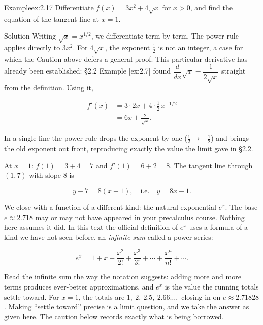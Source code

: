 \documentclass[a4paper,12pt,oneside]{memoir}
\begin{document}
\begin{workedexample}
\begin{envexample}{Example}{ex:2.17}{}
Differentiate \(f(x) = 3x^{2} + 4\sqrt{x}\) for \(x > 0\), and find the equation of the tangent line at \(x = 1\).
\end{envexample}
\begin{envsolution}{Solution}{}{}
Writing \(\sqrt{x} = x^{1/2}\), we differentiate term by term. The power rule applies directly to \(3x^{2}\). For \(4\sqrt{x}\), the exponent \(\tfrac{1}{2}\) is not an integer, a case for which the Caution above defers a general proof. This particular derivative has already been established: §2.2 Example \ref{ex:2.7} found \(\dfrac{d}{dx}\sqrt{x} = \dfrac{1}{2\sqrt{x}}\) straight from the definition. Using it,

\[ \begin{aligned}
          f'(x) &= 3 \cdot 2x + 4 \cdot \tfrac{1}{2}\,x^{-1/2} \\[2pt]
                &= 6x + \frac{2}{\sqrt{x}}.
        \end{aligned} \]

In a single line the power rule drops the exponent by one (\(\tfrac{1}{2} \to -\tfrac{1}{2}\)) and brings the old exponent out front, reproducing exactly the value the limit gave in §2.2.

At \(x = 1\): \(f(1) = 3 + 4 = 7\) and \(f'(1) = 6 + 2 = 8\). The tangent line through \((1, 7)\) with slope \(8\) is

\[ y - 7 = 8(x - 1), \quad\text{i.e.}\quad y = 8x - 1. \]
\end{envsolution}
\end{workedexample}
We close with a function of a different kind: the natural exponential \(e^{x}\). The base \(e \approx 2.718\) may or may not have appeared in your precalculus course. Nothing here assumes it did. In this text the official definition of \(e^{x}\) uses a formula of a kind we have not seen before, an \emph{infinite sum} called a power series:

\[ e^{x} = 1 + x + \frac{x^{2}}{2!} + \frac{x^{3}}{3!} + \cdots + \frac{x^{n}}{n!} + \cdots. \]

Read the infinite sum the way the notation suggests: adding more and more terms produces ever-better approximations, and \(e^{x}\) is the value the running totals settle toward. For \(x = 1\), the totals are \(1,\ 2,\ 2.5,\ 2.66\ldots,\) closing in on \(e \approx 2.71828\). Making “settle toward” precise is a limit question, and we take the answer as given here. The caution below records exactly what is being borrowed.
\end{document}
